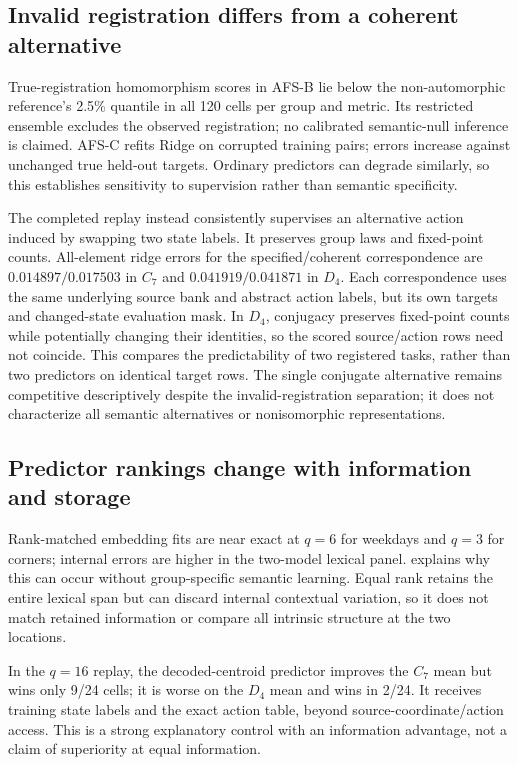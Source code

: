 \documentclass{article}
\begin{document}
\subsection{Invalid registration differs from a coherent alternative}
True-registration homomorphism scores in AFS-B lie below the non-automorphic reference's 2.5\% quantile in all 120 cells per group and metric. Its restricted ensemble excludes the observed registration; no calibrated semantic-null inference is claimed. AFS-C refits Ridge on corrupted training pairs; errors increase against unchanged true held-out targets. Ordinary predictors can degrade similarly, so this establishes sensitivity to supervision rather than semantic specificity.

The completed replay instead consistently supervises an alternative action induced by swapping two state labels. It preserves group laws and fixed-point counts. All-element ridge errors for the specified/coherent correspondence are $0.014897/0.017503$ in $C_7$ and $0.041919/0.041871$ in $D_4$. Each correspondence uses the same underlying source bank and abstract action labels, but its own targets and changed-state evaluation mask. In $D_4$, conjugacy preserves fixed-point counts while potentially changing their identities, so the scored source/action rows need not coincide. This compares the predictability of two registered tasks, rather than two predictors on identical target rows. The single conjugate alternative remains competitive descriptively despite the invalid-registration separation; it does not characterize all semantic alternatives or nonisomorphic representations.

\subsection{Predictor rankings change with information and storage}
\label{sec:characterization}
Rank-matched embedding fits are near exact at $q=6$ for weekdays and $q=3$ for corners; internal errors are higher in the two-model lexical panel.  explains why this can occur without group-specific semantic learning. Equal rank retains the entire lexical span but can discard internal contextual variation, so it does not match retained information or compare all intrinsic structure at the two locations.

In the $q=16$ replay, the decoded-centroid predictor improves the $C_7$ mean but wins only 9/24 cells; it is worse on the $D_4$ mean and wins in 2/24. It receives training state labels and the exact action table, beyond source-coordinate/action access. This is a strong explanatory control with an information advantage, not a claim of superiority at equal information.
\end{document}
